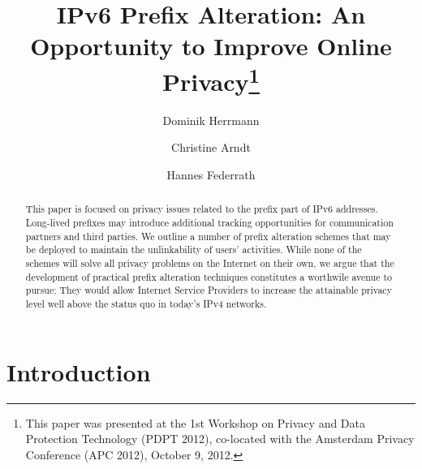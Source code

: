 \documentclass{easychair}
\begin{document}
\title{IPv6 Prefix Alteration: An Opportunity to Improve Online Privacy\footnote{This paper was presented at the 1st Workshop on Privacy and Data Protection Technology (PDPT 2012), co-located with the Amsterdam Privacy Conference (APC 2012), October 9, 2012.}}









\author{
    Dominik Herrmann
\and
    Christine Arndt
\and
   Hannes Federrath
}









\clearpage


\maketitle


\begin{abstract}
This paper is focused on privacy issues related to the prefix part of IPv6 addresses. Long-lived prefixes may introduce additional tracking opportunities for communication partners and third parties. We outline a number of prefix alteration schemes that may be deployed to maintain the unlinkability of users' activities. While none of the schemes will solve all privacy problems on the Internet on their own, we argue that the development of practical prefix alteration techniques constitutes a worthwile avenue to pursue: They would allow Internet Service Providers to increase the attainable privacy level well above the status quo in today's IPv4 networks.
\end{abstract}












\pagestyle{empty}



\section{Introduction}
\end{document}

